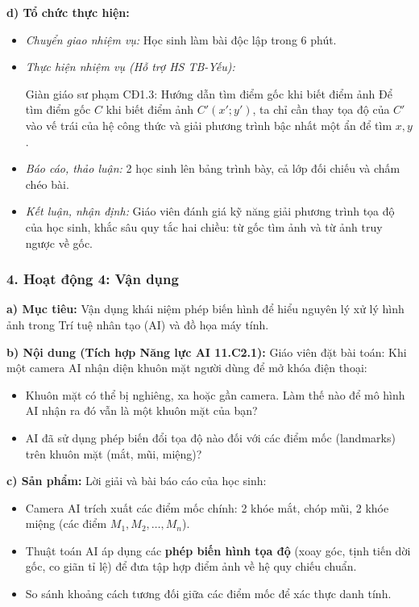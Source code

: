 \documentclass[12pt, a4paper]{article}
\begin{document}
\textbf{d) Tổ chức thực hiện:}
\begin{itemize}[leftmargin=0.6cm]
    \item \textit{Chuyển giao nhiệm vụ:} Học sinh làm bài độc lập trong 6 phút.
    \item \textit{Thực hiện nhiệm vụ (Hỗ trợ HS TB-Yếu):}
    \begin{scaffoldbox}{Giàn giáo sư phạm CĐ1.3: Hướng dẫn tìm điểm gốc khi biết điểm ảnh}
        Để tìm điểm gốc $C$ khi biết điểm ảnh $C'(x'; y')$, ta chỉ cần thay tọa độ của $C'$ vào vế trái của hệ công thức và giải phương trình bậc nhất một ẩn để tìm $x, y$.
    \end{scaffoldbox}
    \item \textit{Báo cáo, thảo luận:} 2 học sinh lên bảng trình bày, cả lớp đối chiếu và chấm chéo bài.
    \item \textit{Kết luận, nhận định:} Giáo viên đánh giá kỹ năng giải phương trình tọa độ của học sinh, khắc sâu quy tắc hai chiều: từ gốc tìm ảnh và từ ảnh truy ngược về gốc.
\end{itemize}

\subsubsection*{4. Hoạt động 4: Vận dụng}
\textbf{a) Mục tiêu:} Vận dụng khái niệm phép biến hình để hiểu nguyên lý xử lý hình ảnh trong Trí tuệ nhân tạo (AI) và đồ họa máy tính.

\textbf{b) Nội dung (Tích hợp Năng lực AI 11.C2.1):}
Giáo viên đặt bài toán: Khi một camera AI nhận diện khuôn mặt người dùng để mở khóa điện thoại:
\begin{itemize}[leftmargin=0.6cm]
    \item Khuôn mặt có thể bị nghiêng, xa hoặc gần camera. Làm thế nào để mô hình AI nhận ra đó vẫn là một khuôn mặt của bạn?
    \item AI đã sử dụng phép biến đổi tọa độ nào đối với các điểm mốc (landmarks) trên khuôn mặt (mắt, mũi, miệng)?
\end{itemize}

\textbf{c) Sản phẩm:} Lời giải và bài báo cáo của học sinh:
\begin{itemize}[leftmargin=0.6cm]
    \item Camera AI trích xuất các điểm mốc chính: 2 khóe mắt, chóp mũi, 2 khóe miệng (các điểm $M_1, M_2, \dots, M_n$).
    \item Thuật toán AI áp dụng các \textbf{phép biến hình tọa độ} (xoay góc, tịnh tiến dời gốc, co giãn tỉ lệ) để đưa tập hợp điểm ảnh về hệ quy chiếu chuẩn.
    \item So sánh khoảng cách tương đối giữa các điểm mốc để xác thực danh tính.
\end{itemize}
\end{document}
